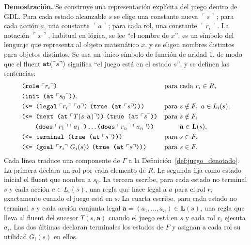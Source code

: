\noindent\textbf{Demostración.} Se construye una representación explícita del juego dentro de GDL. Para cada estado alcanzable $s$ se elige una constante nueva $\ulcorner s \urcorner$; para cada acción $a$, una constante $\ulcorner a \urcorner$; para cada rol, una constante $\ulcorner r_i \urcorner$. La notación $\ulcorner x \urcorner$, habitual en lógica, se lee ``el nombre de $x$'': es un símbolo del lenguaje que representa al objeto matemático $x$, y se eligen nombres distintos para objetos distintos. Se usa un único símbolo de función  de aridad $1$, de modo que el fluent $\texttt{at}(\ulcorner s \urcorner)$ significa ``el juego está en el estado $s$'', y se definen las sentencias:
\begin{align*}
    &\kw{(role}\ \ulcorner r_i \urcorner\kw{)} && \text{para cada } r_i \in R,\\
    &\kw{(init (at}\ \ulcorner s_0 \urcorner\kw{))}, &&\\
    &\kw{(<= (legal}\ \ulcorner r_i \urcorner\ \ulcorner a \urcorner\kw{)}\ \kw{(true (at}\ \ulcorner s \urcorner\kw{)))} && \text{para } s \notin F,\ a \in L_i(s),\\
    &\kw{(<= (next (at}\ \ulcorner T(s, \mathbf a) \urcorner\kw{))}\ \kw{(true (at}\ \ulcorner s \urcorner\kw{))} && \text{para } s \notin F,\\
    &\qquad \kw{(does}\ \ulcorner r_1 \urcorner\ \ulcorner a_1 \urcorner\kw{)} \dots \kw{(does}\ \ulcorner r_n \urcorner\ \ulcorner a_n \urcorner\kw{))} && \phantom{\text{para }} \mathbf a \in \mathbf L(s),\\
    &\kw{(<= terminal (true (at}\ \ulcorner s \urcorner\kw{)))} && \text{para } s \in F,\\
    &\kw{(<= (goal}\ \ulcorner r_i \urcorner\ G_i(s)\kw{)}\ \kw{(true (at}\ \ulcorner s \urcorner\kw{)))} && \text{para } s \in F.
\end{align*}
Cada línea traduce una componente de $\Gamma$ a la Definición~\ref{def:juego_denotado}. La primera declara un rol por cada elemento de $R$. La segunda fija como estado inicial el fluent que nombra a $s_0$. La tercera escribe, para cada estado no terminal $s$ y cada acción $a \in L_i(s)$, una regla que hace legal a $a$ para el rol $r_i$ exactamente cuando el juego está en $s$. La cuarta escribe, para cada estado no terminal $s$ y cada acción conjunta legal $\mathbf a = (a_1, \dots, a_n) \in \mathbf L(s)$, una regla que lleva al fluent del sucesor $T(s, \mathbf a)$ cuando el juego está en $s$ y cada rol $r_i$ ejecuta $a_i$. Las dos últimas declaran terminales los estados de $F$ y asignan a cada rol su utilidad $G_i(s)$ en ellos.


